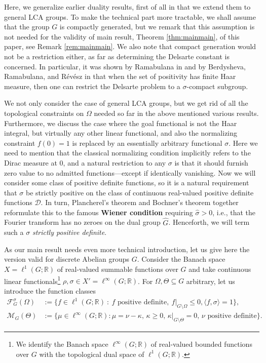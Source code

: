\documentclass[[a4paper,english,12pt]{amsart}
\theoremstyle{plain}
\theoremstyle{remark}
\newcommand{\ft}[1]{\widehat{#1}}
\newcommand{\DD}{{\mathcal D}}
\newcommand{\FF}{\mathcal{F}}
\newcommand{\MM}{\mathcal{M}}
\newcommand{\RR}{\mathbb R}
\newcommand{\si}{\sigma}
\newcommand{\rh}{\rho}
\begin{document}
Here, we generalize earlier duality results, first of all in that we extend them to general LCA groups. To make the technical part more tractable, we shall assume that the group $G$ is compactly generated, but we remark that this assumption is not needed for the validity of main result, Theorem \ref{thm:mainmain}, of this paper, see Remark \ref{rem:mainmain}. We also note that compact generation would not be a restriction either, as far as determining the Delsarte constant is concerned. In particular, it was shown by Ramabulana in \cite{ramabulanaexistence} and by Berdysheva, Ramabulana, and R\'ev\'esz in \cite{ExpoMath} that when the set of positivity has finite Haar measure, then one can restrict the Delsarte problem to a $\sigma$-compact subgroup.

We not only consider the case of general LCA groups, but  we get rid of all the topological constraints on $\Omega$ needed so far in the above mentioned various results. Furthermore, we discuss the case where the goal functional is not the Haar integral, but virtually any other linear functional, and also the normalizing constraint $f(0)=1$ is replaced by an essentially arbitrary functional $\si$. Here we need to mention that the classical normalizing condition implicitly refers to the Dirac measure at $0$, and a natural restriction to any $\si$ is that it should furnish zero value to no admitted functions---except if identically vanishing. Now we will consider some class of positive definite functions, so it is a natural requirement that $\si$ be strictly positive on the class of continuous real-valued positive definite functions $\DD$. In turn, Plancherel's theorem and Bochner's theorem together reformulate this to the famous \textbf{Wiener condition} requiring   $\ft{\si}>0$, i.e., that the Fourier transform has no zeroes on the dual group $\ft{G}$. Henceforth, we will term such a $\sigma$ \emph{strictly positive definite}.

As our main result needs even more technical introduction, let us give here the version valid for discrete Abelian groups $G$. Consider the Banach space $X=\ell^1(G;\RR)$ of real-valued  summable  functions over $G$ and take continuous linear functionals\footnote{We identify the Banach space $\ell^\infty(G;\RR)$ of real-valued  bounded  functions over $G$ with the topological dual space of $\ell^1(G;\RR)$.} $\rh,\si\in X'=\ell^\infty(G;\RR)$.
For $\Omega, \Theta \subseteq  G$ arbitrary, let us introduce the function classes
\begin{align*}
\FF_G^\si(\Omega)&:= \{ f \in \ell^1(G;\RR) ~:~ f \text{ positive definite},~ f|_{G\setminus \Omega} \le 0, \langle f,\si \rangle =1 \},
\\
\MM_G(\Theta)&:= \{ \mu \in \ell^\infty(G;\RR) : \mu=\nu-\kappa, \, \kappa\geq 0, \, \kappa|_{G\setminus\Theta}=0, \, \nu \text{ positive definite} \} .
\end{align*}
\end{document}
